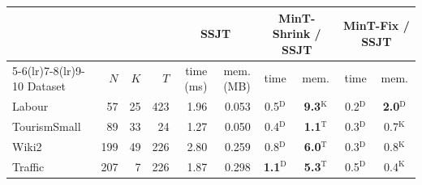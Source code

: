 \footnotesize\setlength{\tabcolsep}{4pt}
\begin{tabular}{l rrr rr cc cc}
\toprule
 & & & & \multicolumn{2}{c}{SSJT} & \multicolumn{2}{c}{MinT-Shrink / SSJT} & \multicolumn{2}{c}{MinT-Fix / SSJT}\\
\cmidrule(lr){5-6}\cmidrule(lr){7-8}\cmidrule(lr){9-10}
Dataset & $N$ & $K$ & $T$ & time (ms) & mem. (MB) & time & mem. & time & mem.\\
\midrule
Labour & 57 & 25 & 423 & 1.96 & 0.053 & 0.5$^{\mathrm{D}}$ & \textbf{9.3}$^{\mathrm{K}}$ & 0.2$^{\mathrm{D}}$ & \textbf{2.0}$^{\mathrm{D}}$\\
TourismSmall & 89 & 33 & 24 & 1.27 & 0.050 & 0.4$^{\mathrm{D}}$ & \textbf{1.1}$^{\mathrm{T}}$ & 0.3$^{\mathrm{D}}$ & 0.7$^{\mathrm{K}}$\\
Wiki2 & 199 & 49 & 226 & 2.80 & 0.259 & 0.8$^{\mathrm{D}}$ & \textbf{6.0}$^{\mathrm{T}}$ & 0.3$^{\mathrm{D}}$ & 0.8$^{\mathrm{K}}$\\
Traffic & 207 & 7 & 226 & 1.87 & 0.298 & \textbf{1.1}$^{\mathrm{D}}$ & \textbf{5.3}$^{\mathrm{T}}$ & 0.5$^{\mathrm{D}}$ & 0.4$^{\mathrm{K}}$\\
\bottomrule
\end{tabular}
